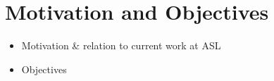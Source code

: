 \section{Motivation and Objectives}
\label{sec:Motivation and Objectives}

\begin{itemize}
	\item Motivation \& relation to current work at ASL
	\item Objectives
\end{itemize}